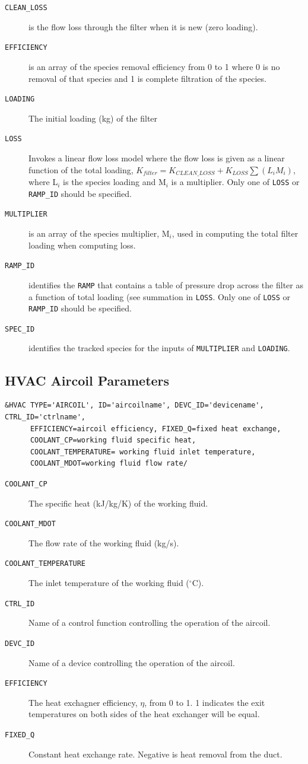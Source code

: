 \documentclass[11pt]{book}
\newcommand{\ct}{\tt\small}
\begin{document}
\begin{description}
\item[{\ct CLEAN\_LOSS}] is the flow loss through the filter when it is new (zero loading).
\item[{\ct EFFICIENCY}] is an array of the species removal efficiency from 0 to 1 where 0 is no removal of that species and 1 is complete filtration of the species.
\item[{\ct LOADING}] The initial loading (kg) of the filter
\item[{\ct LOSS}] Invokes a linear flow loss model where the flow loss is given as a linear function of the total loading, $K_{filter}=K_{CLEAN\_LOSS}+K_{LOSS} \sum \left( L_i M_i \right)$, where L$_i$ is the species loading and M$_i$ is a multiplier.  Only one of {\ct LOSS} or {\ct RAMP\_ID} should be specified.
\item[{\ct MULTIPLIER}] is an array of the species multiplier, M$_i$, used in computing the total filter loading when computing loss.
\item[{\ct RAMP\_ID}] identifies the {\ct RAMP} that contains a table of pressure drop across the filter as a function of total loading (see summation in {\ct LOSS}.   Only one of {\ct LOSS} or {\ct RAMP\_ID} should be specified.
\item[{\ct SPEC\_ID}] identifies the tracked species for the inputs of {\ct MULTIPLIER} and {\ct LOADING}.
\end{description}

\subsection{HVAC Aircoil Parameters}
\label{info:HVACaircoil}
\footnotesize
\begin{verbatim}
&HVAC TYPE='AIRCOIL', ID='aircoilname', DEVC_ID='devicename', CTRL_ID='ctrlname',
      EFFICIENCY=aircoil efficiency, FIXED_Q=fixed heat exchange,
      COOLANT_CP=working fluid specific heat,
      COOLANT_TEMPERATURE= working fluid inlet temperature,
      COOLANT_MDOT=working fluid flow rate/
\end{verbatim}\normalsize


\begin{description}
\item[{\ct COOLANT\_CP}] The specific heat (kJ/kg/K) of the working fluid.
\item[{\ct COOLANT\_MDOT}] The flow rate of the working fluid (kg/s).
\item[{\ct COOLANT\_TEMPERATURE}] The inlet temperature of the working fluid ($^\circ$C).
\item[{\ct CTRL\_ID}] Name of a control function controlling the operation of the aircoil.
\item[{\ct DEVC\_ID}] Name of a device controlling the operation of the aircoil.
\item[{\ct EFFICIENCY}] The heat exchagner efficiency, $\eta$, from 0 to 1.  1 indicates the exit temperatures on both sides of the heat exchanger will be equal.
\item[{\ct FIXED\_Q}] Constant heat exchange rate.  Negative is heat removal from the duct.
\end{description}
\end{document}
